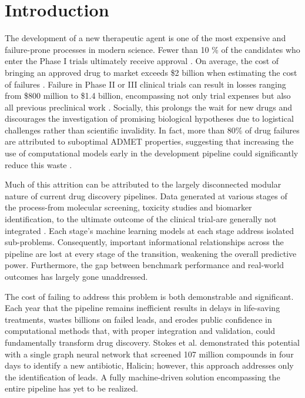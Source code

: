 \documentclass[conference]{IEEEtran}
\begin{document}
\section{Introduction}
The development of a new therapeutic agent is one of the most expensive and failure-prone processes in modern science. Fewer than 10 \% of the candidates who enter the Phase I trials ultimately receive approval \cite{b1}. On average, the cost of bringing an approved drug to market exceeds \$2 billion when estimating the cost of failures \cite{b2}. Failure in Phase II or III clinical trials can result in losses ranging from \$800 million to \$1.4 billion, encompassing not only trial expenses but also all previous preclinical work \cite{b1}. Socially, this prolongs the wait for new drugs and discourages the investigation of promising biological hypotheses due to logistical challenges rather than scientific invalidity. In fact, more than 80\% of drug failures are attributed to suboptimal ADMET properties, suggesting that increasing the use of computational models early in the development pipeline could significantly reduce this waste \cite{b8}.

Much of this attrition can be attributed to the largely disconnected modular nature of current drug discovery pipelines. Data generated at various stages of the process-from molecular screening, toxicity studies and biomarker identification, to the ultimate outcome of the clinical trial-are generally not integrated \cite{b3}. Each stage's machine learning models at each stage address isolated sub-problems. Consequently, important informational relationships across the pipeline are lost at every stage of the transition, weakening the overall predictive power. Furthermore, the gap between benchmark performance and real-world outcomes has largely gone unaddressed.

The cost of failing to address this problem is both demonstrable and significant. Each year that the pipeline remains inefficient results in delays in life-saving treatments, wastes billions on failed leads, and erodes public confidence in computational methods that, with proper integration and validation, could fundamentally transform drug discovery. Stokes et al. \cite{b11} demonstrated this potential with a single graph neural network that screened 107 million compounds in four days to identify a new antibiotic, Halicin; however, this approach addresses only the identification of leads. A fully machine-driven solution encompassing the entire pipeline has yet to be realized.
\end{document}

